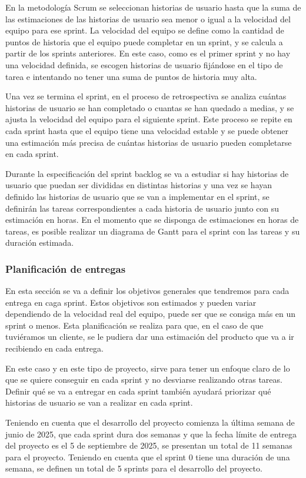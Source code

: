 En la metodología Scrum se seleccionan historias de usuario hasta que la suma de las estimaciones de las historias de usuario sea menor o igual a la velocidad del equipo para ese sprint.
La velocidad del equipo se define como la cantidad de puntos de historia que el equipo puede completar en un sprint, y se calcula a partir de los sprints anteriores.
En este caso, como es el primer sprint y no hay una velocidad definida, se escogen historias de usuario fijándose en el tipo de tarea e intentando no tener una suma de puntos de historia muy alta.

Una vez se termina el sprint, en el proceso de retrospectiva se analiza cuántas historias de usuario se han completado o cuantas se han quedado a medias, y se ajusta la velocidad del equipo para el siguiente sprint. Este proceso se repite en cada sprint hasta que el equipo tiene una velocidad estable y se puede obtener una estimación más precisa de cuántas historias de usuario pueden completarse en cada sprint.

Durante la especificación del sprint backlog se va a estudiar si hay historias de usuario que puedan ser divididas en distintas historias y una vez se hayan definido las historias de usuario que se van a implementar en el sprint, se definirán las tareas correspondientes a cada historia de usuario junto con su estimación en horas.
En el momento que se disponga de estimaciones en horas de tareas, es posible realizar un diagrama de Gantt para el sprint con las tareas y su duración estimada.

\subsubsection{Planificación de entregas}
En esta sección se va a definir los objetivos generales que tendremos para cada entrega en caga sprint. Estos objetivos son estimados y pueden variar dependiendo de la velocidad real del equipo, puede ser que se consiga más en un sprint o menos. Esta planificación se realiza para que, en el caso de que tuviéramos un cliente, se le pudiera dar una estimación del producto que va a ir recibiendo en cada entrega.

En este caso y en este tipo de proyecto, sirve para tener un enfoque claro de lo que se quiere conseguir en cada sprint y no desviarse realizando otras tareas.
Definir qué se va a entregar en cada sprint también ayudará priorizar qué historias de usuario se van a realizar en cada sprint.

Teniendo en cuenta que el desarrollo del proyecto comienza la última semana de junio de 2025, que cada sprint dura dos semanas y que la fecha límite de entrega del proyecto es el 5 de septiembre de 2025, se presentan un total de 11 semanas para el proyecto. Teniendo en cuenta que el sprint 0 tiene una duración de una semana, se definen un total de 5 sprints para el desarrollo del proyecto.

